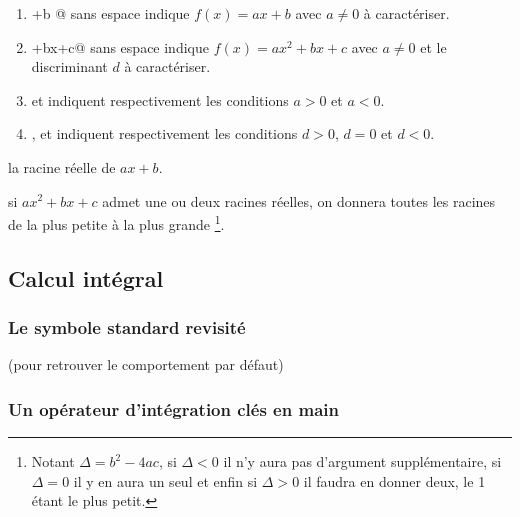 \documentclass[12pt,a4paper]{book}
\theoremstyle{definition}
\begin{document}
{{\begin{enumerate}

	\medskip
	
	\item \verb@ax+b    @ sans espace indique $f(x) = ax + b$ avec $a \neq 0$ à caractériser.

	\item {}+bx+c@ sans espace indique $f(x) = ax^2 + bx + c$ avec $a \neq 0$ et le discriminant $d$ à caractériser.


	\medskip
	
	\item \verb@ap@ et \verb@an@ indiquent respectivement les conditions $a > 0$ et $a < 0$.

	\item \verb@dp@, \verb@dz@ et \verb@dn@ indiquent respectivement les conditions $d > 0$, $d = 0$ et $d < 0$.
\end{enumerate}


 la racine réelle de $ax + b$.


 si $ax^2 + bx + c$ admet une ou deux racines réelles, on donnera toutes les racines de la plus petite à la plus grande
\footnote{
	Notant $\Delta = b^2 - 4 ac$, si $\Delta < 0$ il n'y aura pas d'argument supplémentaire, si $\Delta = 0$ il y en aura un seul et enfin si $\Delta > 0$ il faudra en donner deux, le 1\ier{} étant le plus petit.
}.


\subsection{Calcul intégral}

\subsubsection{Le symbole standard revisité}



 (pour retrouver le comportement par défaut)




\subsubsection{Un opérateur d'intégration clés en main}




}}
\end{document}
